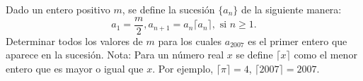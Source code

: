 Dado un entero positivo $m$, se define la sucesión $\{ a_n \}$ de la siguiente manera:
\[ a_1 = \frac{m}{2}, a_{n+1} = a_n \lceil a_n \rceil, \text{ si } n \geq 1. \]
Determinar todos los valores de $m$ para los cuales $a_{2007}$ es el primer entero que aparece en la sucesión. \newline 
Nota: Para un número real $x$ se define $\lceil x \rceil$ como el menor entero que es mayor o igual que $x$. Por ejemplo, $\lceil \pi \rceil = 4$, $\lceil 2007 \rceil = 2007$.
